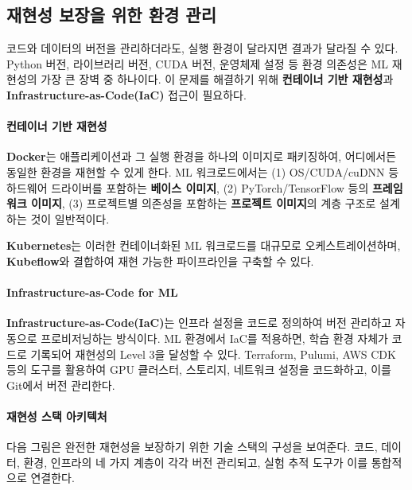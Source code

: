 \subsection{재현성 보장을 위한 환경 관리}
\label{sec:14.2.4}

코드와 데이터의 버전을 관리하더라도, 실행 환경이 달라지면 결과가 달라질 수 있다. Python 버전, 라이브러리 버전, CUDA 버전, 운영체제 설정 등 환경 의존성은 ML 재현성의 가장 큰 장벽 중 하나이다. 이 문제를 해결하기 위해 \textbf{컨테이너 기반 재현성}과 \textbf{Infrastructure-as-Code(IaC)} 접근이 필요하다\cite{kreuzberger2023machine}.

\paragraph{컨테이너 기반 재현성}

\textbf{Docker}는 애플리케이션과 그 실행 환경을 하나의 이미지로 패키징하여, 어디에서든 동일한 환경을 재현할 수 있게 한다. ML 워크로드에서는 (1) OS/CUDA/cuDNN 등 하드웨어 드라이버를 포함하는 \textbf{베이스 이미지}, (2) PyTorch/TensorFlow 등의 \textbf{프레임워크 이미지}, (3) 프로젝트별 의존성을 포함하는 \textbf{프로젝트 이미지}의 계층 구조로 설계하는 것이 일반적이다.

\textbf{Kubernetes}는 이러한 컨테이너화된 ML 워크로드를 대규모로 오케스트레이션하며, \textbf{Kubeflow}와 결합하여 재현 가능한 파이프라인을 구축할 수 있다.

\paragraph{Infrastructure-as-Code for ML}

\textbf{Infrastructure-as-Code(IaC)}는 인프라 설정을 코드로 정의하여 버전 관리하고 자동으로 프로비저닝하는 방식이다. ML 환경에서 IaC를 적용하면, 학습 환경 자체가 코드로 기록되어 재현성의 Level 3을 달성할 수 있다. Terraform, Pulumi, AWS CDK 등의 도구를 활용하여 GPU 클러스터, 스토리지, 네트워크 설정을 코드화하고, 이를 Git에서 버전 관리한다.

\paragraph{재현성 스택 아키텍처}

다음 그림은 완전한 재현성을 보장하기 위한 기술 스택의 구성을 보여준다. 코드, 데이터, 환경, 인프라의 네 가지 계층이 각각 버전 관리되고, 실험 추적 도구가 이를 통합적으로 연결한다.

